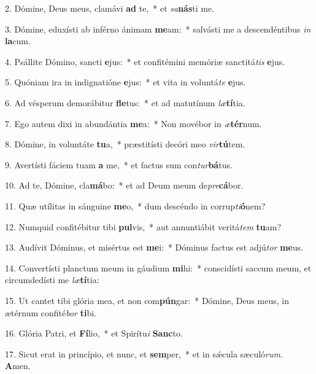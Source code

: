2. Dómine, Deus meus, clamávi \textbf{ad} te,~*  et \textit{sa}\textbf{nás}ti me.\

3. Dómine, eduxísti ab inférno ánimam \textbf{me}am:~*  salvásti me a descendéntibus \textit{in} \textbf{la}cum.\

4. Psállite Dómino, sancti \textbf{e}jus:~*  et confitémini memóriæ sanctitá\textit{tis} \textbf{e}jus.\

5. Quóniam ira in indignatióne \textbf{e}jus:~*  et vita in voluntá\textit{te} \textbf{e}jus.\

6. Ad vésperum demorábitur \textbf{fle}tus:~*  et ad matutínum \textit{læ}\textbf{tí}tia.\

7. Ego autem dixi in abundántia \textbf{me}a:~*  Non movébor in \textit{æ}\textbf{tér}num.\

8. Dómine, in voluntáte \textbf{tu}a,~*  præstitísti decóri meo \textit{vir}\textbf{tú}tem.\

9. Avertísti fáciem tuam \textbf{a} me,~*  et factus sum con\textit{tur}\textbf{bá}tus.\

10. Ad te, Dómine, cla\textbf{má}bo:~*  et ad Deum meum de\textit{pre}\textbf{cá}bor.\

11. Quæ utílitas in sánguine \textbf{me}o,~*  dum descéndo in corrup\textit{ti}\textbf{ó}nem?\

12. Numquid confitébitur tibi \textbf{pul}vis,~*  aut annuntiábit veritá\textit{tem} \textbf{tu}am?\

13. Audívit Dóminus, et misértus est \textbf{me}i:~*  Dóminus factus est adjú\textit{tor} \textbf{me}us.\

14. Convertísti planctum meum in gáudium \textbf{mi}hi:~*  conscidísti saccum meum, et circumdedísti me \textit{læ}\textbf{tí}tia:\

15. Ut cantet tibi glória mea, et non com\textbf{pún}gar:~*  Dómine, Deus meus, in ætérnum confité\textit{bor} \textbf{ti}bi.\

16. Glória Patri, et \textbf{Fí}lio,~*  et Spirítu\textit{i} \textbf{Sanc}to.\

17. Sicut erat in princípio, et nunc, et \textbf{sem}per,~*  et in sǽcula sæculó\textit{rum}. \textbf{A}men.\

